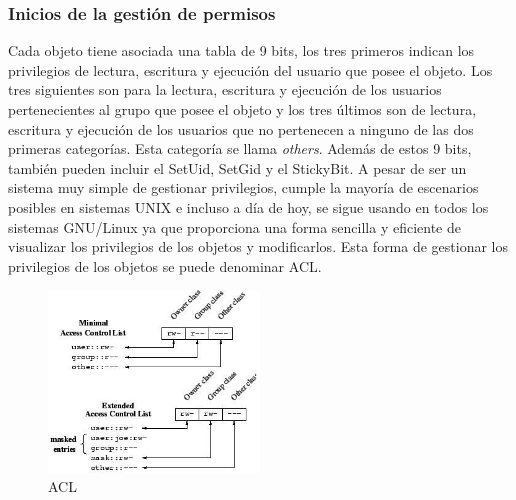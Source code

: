 \documentclass[titlepage]{article}
\begin{document}
\subsubsection{Inicios de la gestión de permisos}
Cada objeto tiene asociada una tabla de 9 bits, los tres primeros indican los privilegios de lectura, escritura y ejecución del usuario que posee el objeto. Los tres siguientes son para la lectura, escritura y ejecución de los usuarios pertenecientes al grupo que posee el objeto y los tres últimos son de lectura, escritura y ejecución de los usuarios que no pertenecen a ninguno de las dos primeras categorías. Esta categoría se llama \textit{others}. Además de estos 9 bits, también pueden incluir el \Gls{SetUid}, \Gls{SetGid} y el \Gls{StickyBit}. A pesar de ser un sistema muy simple de gestionar privilegios, cumple la mayoría de escenarios posibles en sistemas UNIX e incluso a día de hoy, se sigue usando en todos los sistemas \Gls{GNU/Linux} ya que proporciona una forma sencilla y eficiente de visualizar los privilegios de los objetos y modificarlos. Esta forma de gestionar los privilegios de los objetos se puede denominar \Gls{ACL}.
\begin{figure}[H]
    \centering
    \includegraphics[width=0.5\textwidth]{Media/ACL.jpg}
    \caption{\Gls{ACL}}
    \label{fig:ACL}
\end{figure}
\end{document}
